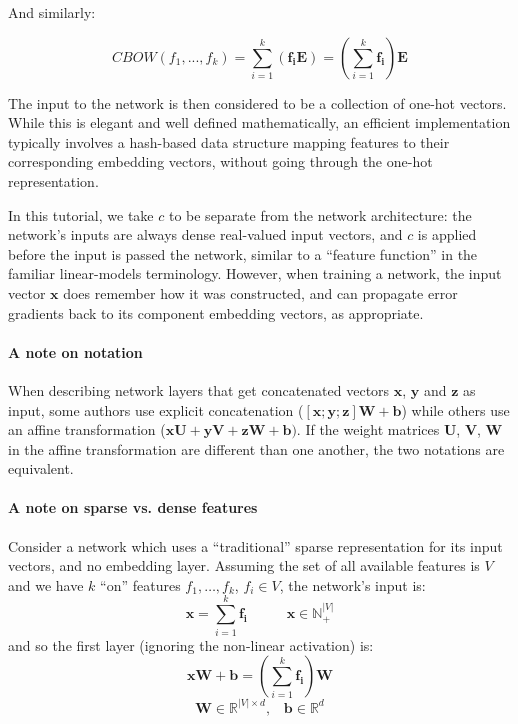 \documentclass[jair,twoside,11pt,theapa]{article}
\newcommand{\m}[1]{\mathbf{#1}}%
\begin{document}
{And similarly:

\[ CBOW(f_1,...,f_k) = \sum_{i=1}^{k} (\m{f_i} \m{E}) = (\sum_{i=1}^{k} \m{f_i}) \m{E} \]

The input to the network is then considered to be a collection of one-hot
vectors.  While this is elegant and well defined mathematically, an efficient
implementation typically involves a hash-based data structure mapping features
to their corresponding embedding vectors, without going through the one-hot
representation.

In this tutorial, we take $c$ to be separate from the
network architecture: the network's inputs are always dense real-valued input
vectors, and $c$ is applied before the input is passed the network, similar to a
``feature function'' in the familiar linear-models terminology.  However, when
training a network, the input vector $\m{x}$ does remember how it was
constructed, and can propagate error gradients back to its component embedding
vectors, as appropriate. 

\paragraph{A note on notation} When describing network layers that get
concatenated vectors $\m{x}$, $\m{y}$ and $\m{z}$ as input, some authors
use explicit concatenation
($[\m{x};\m{y};\m{z}]\m{W} + \m{b}$) while others use an affine transformation
($\m{x}\m{U} + \m{y}\m{V} + \m{z}\m{W} + \m{b})$.  If the weight matrices
$\m{U}$, $\m{V}$, $\m{W}$ in the affine transformation are different than one
another, the two notations are equivalent.

\paragraph{A note on sparse vs. dense features} Consider a network which uses
a ``traditional'' sparse representation for its input vectors,
and no embedding layer.  
Assuming the set of all available features is $V$ and we have $k$ ``on''
features $f_1,\ldots,f_k$, $f_i \in V$,
the network's input is:
\[
\m{x} = \sum_{i=1}^{k} \m{f_i} \;\;\;\;\;\;\;\;\;\; \m{x} \in \mathbb{N}_+^{|V|}
\] 
\noindent and so the first layer (ignoring the non-linear activation) is:
\[
\m{x}\m{W} + \m{b} = (\sum_{i=1}^{k} \m{f_i})\m{W}
\]
\[
\m{W} \in \mathbb{R}^{|V|\times d}, \;\;\; \m{b}\in\mathbb{R}^d
\]

}
\end{document}
